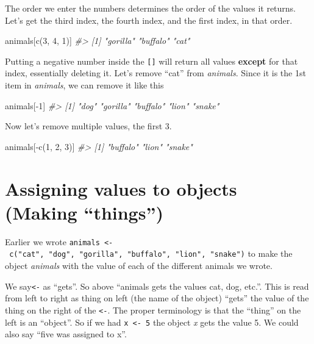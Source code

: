 \documentclass[
  12pt,
  openany]{book}
\newenvironment{Shaded}{\begin{snugshade}}{\end{snugshade}}
\newcommand{\CommentTok}[1]{\textcolor[rgb]{0.37,0.37,0.37}{\textit{#1}}}
\newcommand{\DecValTok}[1]{\textcolor[rgb]{0.06,0.06,0.06}{#1}}
\newcommand{\FunctionTok}[1]{\textcolor[rgb]{0,0,0}{#1}}
\newcommand{\NormalTok}[1]{#1}
\newcommand{\SpecialCharTok}[1]{\textcolor[rgb]{0,0,0}{#1}}
\begin{document}
The order we enter the numbers determines the order of the values it returns. Let's get the third index, the fourth index, and the first index, in that order.

\begin{Shaded}
\begin{Highlighting}[]
\NormalTok{animals[}\FunctionTok{c}\NormalTok{(}\DecValTok{3}\NormalTok{, }\DecValTok{4}\NormalTok{, }\DecValTok{1}\NormalTok{)]}
\CommentTok{\#\textgreater{} [1] "gorilla" "buffalo" "cat"}
\end{Highlighting}
\end{Shaded}

Putting a negative number inside the \texttt{{[}{]}} will return all values \textbf{except} for that index, essentially deleting it. Let's remove ``cat'' from \emph{animals}. Since it is the 1st item in \emph{animals}, we can remove it like this

\begin{Shaded}
\begin{Highlighting}[]
\NormalTok{animals[}\SpecialCharTok{{-}}\DecValTok{1}\NormalTok{]}
\CommentTok{\#\textgreater{} [1] "dog"     "gorilla" "buffalo" "lion"    "snake"}
\end{Highlighting}
\end{Shaded}

Now let's remove multiple values, the first 3.

\begin{Shaded}
\begin{Highlighting}[]
\NormalTok{animals[}\SpecialCharTok{{-}}\FunctionTok{c}\NormalTok{(}\DecValTok{1}\NormalTok{, }\DecValTok{2}\NormalTok{, }\DecValTok{3}\NormalTok{)]}
\CommentTok{\#\textgreater{} [1] "buffalo" "lion"    "snake"}
\end{Highlighting}
\end{Shaded}

\hypertarget{assignment}{%
\section{Assigning values to objects (Making ``things'')}\label{assignment}}

Earlier we wrote \texttt{animals\ \textless{}-\ c("cat",\ "dog",\ "gorilla",\ "buffalo",\ "lion",\ "snake")} to make the object \emph{animals} with the value of each of the different animals we wrote.

We say\texttt{\textless{}-} as ``gets''. So above ``animals gets the values cat, dog, etc.''. This is read from left to right as thing on left (the name of the object) ``gets'' the value of the thing on the right of the \texttt{\textless{}-}. The proper terminology is that the ``thing'' on the left is an ``object''. So if we had \texttt{x\ \textless{}-\ 5} the object \emph{x} gets the value 5. We could also say ``five was assigned to x''.
\end{document}
